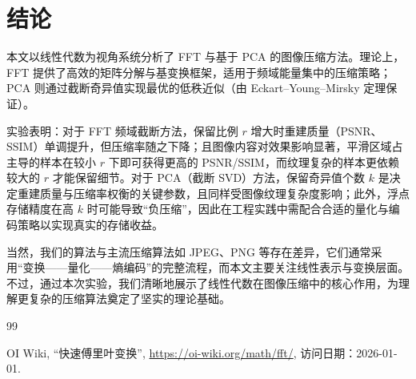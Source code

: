 \documentclass[12pt,a4paper]{article}
\begin{document}
\section{结论}

本文以线性代数为视角系统分析了 FFT 与基于 PCA 的图像压缩方法。理论上，FFT 提供了高效的矩阵分解与基变换框架，适用于频域能量集中的压缩策略；PCA 则通过截断奇异值实现最优的低秩近似（由 Eckart--Young--Mirsky 定理保证）。

实验表明：对于 FFT 频域截断方法，保留比例 $r$ 增大时重建质量（PSNR、SSIM）单调提升，但压缩率随之下降；且图像内容对效果影响显著，平滑区域占主导的样本在较小 $r$ 下即可获得更高的 PSNR/SSIM，而纹理复杂的样本更依赖较大的 $r$ 才能保留细节。对于 PCA（截断 SVD）方法，保留奇异值个数 $k$ 是决定重建质量与压缩率权衡的关键参数，且同样受图像纹理复杂度影响；此外，浮点存储精度在高 $k$ 时可能导致“负压缩”，因此在工程实践中需配合合适的量化与编码策略以实现真实的存储收益。

当然，我们的算法与主流压缩算法如 JPEG、PNG 等存在差异，它们通常采用“变换——量化——熵编码”的完整流程，而本文主要关注线性表示与变换层面。不过，通过本次实验，我们清晰地展示了线性代数在图像压缩中的核心作用，为理解更复杂的压缩算法奠定了坚实的理论基础。
\begin{thebibliography}{99}

OI Wiki, ``快速傅里叶变换'', \url{https://oi-wiki.org/math/fft/}, 访问日期：2026-01-01.

\end{thebibliography}
\end{document}
